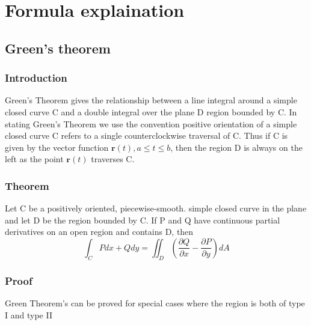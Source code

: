 \documentclass[a4paper]{article}
\begin{document}
\section{Formula explaination}
\subsection{Green's theorem}
\subsubsection{Introduction}
Green’s Theorem gives the relationship between a line integral around a simple closed curve C and a double integral over the plane D region bounded by C. In stating Green's Theorem we use the convention positive orientation of a simple closed curve C refers to a single counterclockwise traversal of C. Thus if C is given by the vector function $\textbf{r}(t), a\leq t\leq b$, then the region D is always on the left as the point $\textbf{r}(t)$ traverses C.
\subsubsection{Theorem}
Let C be a positively oriented, piecewise-smooth. simple closed curve in the plane and let D be the region bounded by C. If P and Q have continuous partial derivatives on an open region and contains D, then
\[\int_{C} Pdx+Qdy=\iint_{D}\left(\dfrac{\partial Q}{\partial x}-\dfrac{\partial P}{\partial y} \right )dA\]
\subsubsection{Proof}
Green Theorem's can be proved for special cases where the region is both of type I and type II
\end{document}
